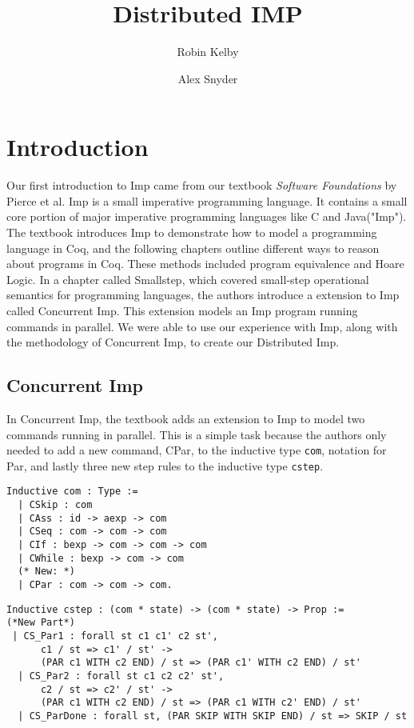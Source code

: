 \documentclass{llncs}
\begin{document}
\title{Distributed IMP}

\author{Robin Kelby \and Alex Snyder}

\maketitle

\section{Introduction}
Our first introduction to Imp came from our textbook \textit{Software Foundations} by Pierce et al. Imp is a small imperative programming language. It contains a small core portion of major imperative programming languages like C and Java("Imp"). The textbook introduces Imp to demonstrate how to model a programming language in Coq, and the following chapters outline different ways to reason about programs in Coq. These methods included program equivalence and Hoare Logic. In a chapter called Smallstep, which covered small-step operational semantics for programming languages, the authors introduce a extension to Imp called Concurrent Imp. This extension models an Imp program running commands in parallel. We were able to use our experience with Imp, along with the methodology of Concurrent Imp, to create our Distributed Imp.

\subsection{Concurrent Imp} 
In Concurrent Imp, the textbook adds an extension to Imp to model two commands running in parallel. This is a simple task because the authors only needed to add a new command, CPar, to the inductive type \lstinline|com|, notation for Par, and lastly three new step rules to the inductive type \lstinline|cstep|.  

\begin{lstlisting}
Inductive com : Type :=
  | CSkip : com
  | CAss : id -> aexp -> com
  | CSeq : com -> com -> com
  | CIf : bexp -> com -> com -> com
  | CWhile : bexp -> com -> com
  (* New: *)
  | CPar : com -> com -> com.
\end{lstlisting}

\begin{lstlisting}
Inductive cstep : (com * state) -> (com * state) -> Prop :=
(*New Part*)
 | CS_Par1 : forall st c1 c1' c2 st',
      c1 / st => c1' / st' ->
      (PAR c1 WITH c2 END) / st => (PAR c1' WITH c2 END) / st'
  | CS_Par2 : forall st c1 c2 c2' st',
      c2 / st => c2' / st' ->
      (PAR c1 WITH c2 END) / st => (PAR c1 WITH c2' END) / st'
  | CS_ParDone : forall st, (PAR SKIP WITH SKIP END) / st => SKIP / st
\end{lstlisting}
\end{document}

